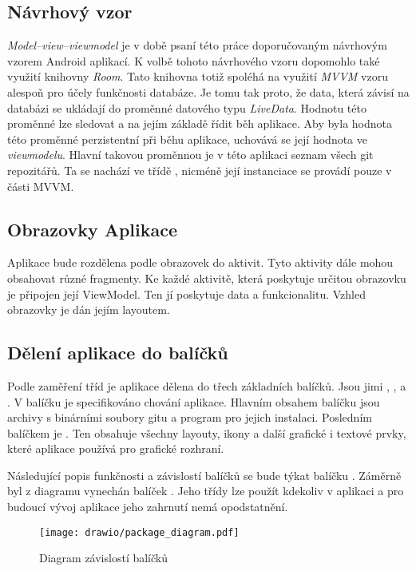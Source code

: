     \subsection{Návrhový vzor}
    \emph{Model–view–viewmodel} je v době psaní této práce doporučovaným návrhovým vzorem Android aplikací. K volbě tohoto návrhového vzoru dopomohlo také využití knihovny \emph{Room}. Tato knihovna totiž spoléhá na využití \emph{MVVM} vzoru alespoň pro účely funkčnosti databáze. Je tomu tak proto, že data, která závisí na databázi se ukládají do proměnné datového typu \emph{LiveData}. Hodnotu této proměnné lze sledovat a na jejím základě řídit běh aplikace. Aby byla hodnota této proměnné perzistentní při běhu aplikace, uchovává se její hodnota ve \emph{viewmodelu}. Hlavní takovou proměnnou je v této aplikaci seznam všech git repozitářů. Ta se nachází ve třídě , nicméně její instanciace se provádí pouze v části  MVVM.
    
    \subsection{Obrazovky Aplikace}
    Aplikace bude rozdělena podle obrazovek do aktivit. Tyto aktivity dále mohou obsahovat různé fragmenty. Ke každé aktivitě, která poskytuje určitou obrazovku je připojen její ViewModel. Ten jí poskytuje data a funkcionalitu. Vzhled obrazovky je dán jejím layoutem.

    \newpage
    \subsection{Dělení aplikace do balíčků}
    Podle zaměření tříd je aplikace dělena do třech základních balíčků. Jsou jimi , , a . V balíčku  je specifikováno chování aplikace. Hlavním obsahem balíčku  jsou archivy s binárními soubory gitu a program  pro jejich instalaci. Posledním balíčkem je . Ten obsahuje všechny layouty, ikony a další grafické i textové prvky, které aplikace používá pro grafické rozhraní.

    Následující popis funkčnosti a závislostí balíčků se bude týkat balíčku . Záměrně byl z diagramu vynechán balíček . Jeho třídy lze použít kdekoliv v aplikaci a pro budoucí vývoj aplikace jeho zahrnutí nemá opodstatnění.

    \begin{figure}[h]
        \centering
        \vspace{0.5cm}
        \texttt{[image: drawio/package\_diagram.pdf]}
        \caption[Diagram závislostí balíčků]{Diagram závislostí balíčků}
        \label{diagram:packages}
    \end{figure}

